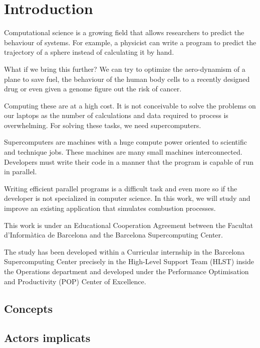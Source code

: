 \section{Introduction}

Computational science is a growing field that allows researchers to predict the behaviour of systems. For example, a physicist can write a program to predict the trajectory of a sphere instead of calculating it by hand.

 What if we bring this further?  We can try to optimize the aero-dynamism of a plane to save fuel, the behaviour of the human body cells to a recently designed drug or even given a genome figure out the risk of cancer.

Computing these are at a high cost. It is not conceivable to solve the problems on our laptops as the number of calculations and data required to process is overwhelming. For solving these tasks, we need supercomputers.

Supercomputers are machines with a huge compute power oriented to scientific and technique jobs. These machines are many small machines interconnected. Developers must write their code in a manner that the program is capable of run in parallel. 

Writing efficient parallel programs is a difficult task and even more so if the developer is not specialized in computer science. In this work, we will study and improve an existing application that simulates combustion processes.

This work is under an Educational Cooperation Agreement between the Facultat d'Informàtica de Barcelona and the Barcelona Supercomputing Center.

The study has been developed within a Curricular internship in the Barcelona Supercomputing Center precisely in the High-Level Support Team (HLST) inside the Operations department and developed under the Performance Optimisation and Productivity (POP) Center of Excellence.


\subsection{Concepts}

\subsubsection{ }

\subsection{Actors implicats}

